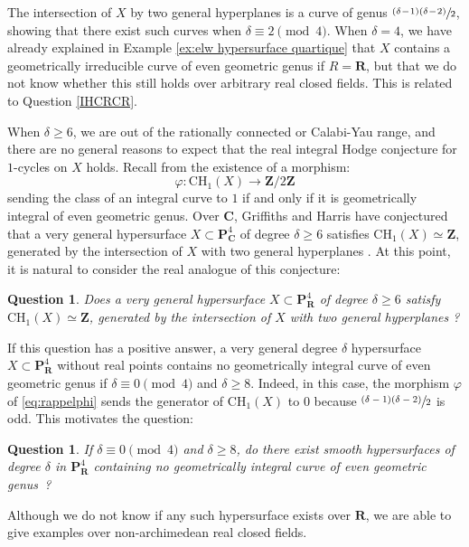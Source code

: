 \documentclass[JEP,XML,SOM,Unicode]{cedram}
\theoremstyle{plain}
\newtheorem{question}[thm]{Question}
\theoremstyle{definition}
\numberwithin{equation}{section}
\renewcommand{\C}{{\mathbf C}}
\renewcommand{\P}{{\mathbf P}}
\newcommand{\R}{{\mathbf R}}
\newcommand{\Z}{{\mathbf Z}}
\newcommand{\CH}{\mathrm{CH}}
\renewcommand{\phi}{\varphi}
\begin{document}
The intersection of $X$ by two general hyperplanes is a curve of genus $\sfrac{(\delta\!-\!1)(\delta\!-\!2)}{2}$, showing that there exist such curves when $\delta\equiv 2\pmod 4$.
When $\delta=4$, we have already explained in Example \ref{ex:elw hypersurface quartique} that $X$ contains a geometrically irreducible curve of even geometric genus if $R=\R$, but that we do not know whether this still holds over arbitrary real closed fields. This is related to Question \ref{IHCRCR}.

When $\delta\geq 6$, we are out of the rationally connected or Calabi-Yau range, and there are no general reasons to expect that the real integral Hodge conjecture for $1$-cycles on $X$ holds. Recall from \cite[Th.\,\ref*{BW1-th:phi}]{BW1} the existence of a morphism:
\begin{equation}
\label{eq:rappelphi}\phi:\CH_1(X)\to\Z/2\Z
\end{equation}
sending the class of an integral curve to $1$ if and only if it is geometrically integral of even geometric genus. Over $\C$, Griffiths and Harris have conjectured that a very general hypersurface $X\subset\P^4_{\C}$ of degree $\delta\geq 6$ satisfies $\CH_1(X)\simeq\Z$, generated by the intersection of $X$ with two general hyperplanes \cite[1) p.~32]{griffithsharrisnl}. At this point, it is natural to consider the real analogue of this conjecture:
\begin{question}
\label{griffithsharrisreel}
Does a very general hypersurface $X\subset\P^4_{\R}$ of degree $\delta\geq 6$ satisfy $\CH_1(X)\simeq\Z$, generated by the intersection of $X$ with two general hyperplanes ?
\end{question}
If this question has a positive answer, a very general degree $\delta$ hypersurface $X\subset\P^4_{\R}$ without real points contains no geometrically integral curve of even geometric genus if $\delta\equiv 0\pmod 4$ and $\delta\geq 8$. Indeed, in this case, the morphism $\phi$ of \eqref{eq:rappelphi} sends the generator of $\CH_1(X)$ to $0$ because $\sfrac{(\delta-1)(\delta-2)}{2}$ is odd. This motivates the question:

\begin{question}
If $\delta\equiv 0\pmod 4$ and $\delta\geq 8$, do there exist smooth hypersurfaces
of degree $\delta$ in $\P^4_{\R}$ containing no geometrically integral curve of even geometric genus~?
\end{question}

Although we do not know if any such hypersurface exists over $\R$, we are able to give examples over non-archimedean real closed fields.
\end{document}
